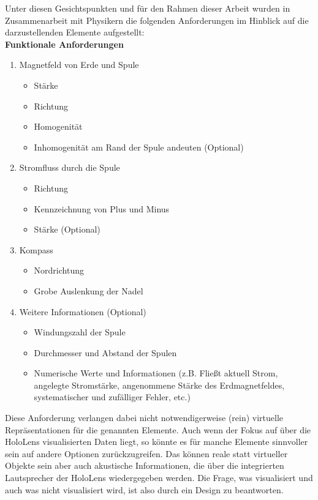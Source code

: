 Unter diesen Gesichtspunkten und für den Rahmen dieser Arbeit wurden in Zusammenarbeit mit Physikern die folgenden Anforderungen im Hinblick auf die darzustellenden Elemente aufgestellt:\\[4px]
\textbf{Funktionale Anforderungen}
\begin{enumerate}[topsep=-2px]
	\setlength{\itemsep}{-5pt}
	\item Magnetfeld von Erde und Spule
	\begin{itemize}[topsep=-0.25em]
		\setlength{\itemsep}{-0.25em}
		\item Stärke
		\item Richtung
		\item Homogenität
		\item Inhomogenität am Rand der Spule andeuten (Optional) 
	\end{itemize}
	\item Stromfluss durch die Spule
	\begin{itemize}[topsep=-0.25em]
		\setlength{\itemsep}{-0.25em}
		\item Richtung
		\item Kennzeichnung von Plus und Minus
		\item Stärke (Optional) 
	\end{itemize}
	\item Kompass
	\begin{itemize}[topsep=-0.25em]
		\setlength{\itemsep}{-0.25em}
		\item Nordrichtung
		\item Grobe Auslenkung der Nadel
	\end{itemize}
	\item Weitere Informationen (Optional)
	\begin{itemize}[topsep=-0.25em]
		\setlength{\itemsep}{-0.25em}
		\item Windungszahl der Spule
		\item Durchmesser und Abstand der Spulen
		\item Numerische Werte und Informationen (z.B. Fließt aktuell Strom, angelegte Stromstärke, angenommene Stärke des Erdmagnetfeldes, systematischer und zufälliger Fehler, etc.)
	\end{itemize}
\end{enumerate}

Diese Anforderung verlangen dabei nicht notwendigerweise (rein) virtuelle Repräsentationen für die genannten Elemente. Auch wenn der Fokus auf über die HoloLens visualisierten Daten liegt, so könnte es für manche Elemente sinnvoller sein auf andere Optionen zurückzugreifen. Das können reale statt virtueller Objekte sein aber auch akustische Informationen, die über die integrierten Lautsprecher der HoloLens wiedergegeben werden. Die Frage, was visualisiert und auch was nicht visualisiert wird, ist also durch ein Design zu beantworten.\\

